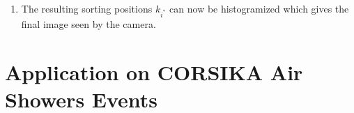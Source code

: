 \begin{enumerate}
	\item The resulting sorting positions $k_{i^\ast}$ can now be histogramized which gives the final image seen by the camera.
\end{enumerate}

\section{Application on CORSIKA Air Showers Events}

